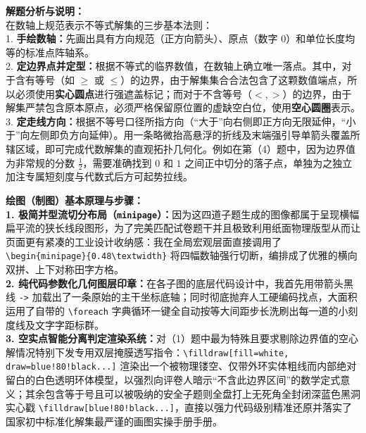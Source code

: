 {\small\color{gray}
\textbf{解题分析与说明：}\\
在数轴上规范表示不等式解集的三步基本法则：\\
1. \textbf{手绘数轴：}先画出具有方向规范（正方向箭头）、原点（数字 $0$）和单位长度均等的标准点阵轴系。\\
2. \textbf{定边界点并定型：}根据不等式的临界数值，在数轴上确立唯一落点。其中，对于含有等号（如 $\geqslant$ 或 $\leqslant$）的边界，由于解集集合合法包含了这颗数值端点，所以必须使用\textbf{实心圆点}进行强遮盖标记；而对于不含等号（$<, >$）的边界，由于解集严禁包含原本原点，必须严格保留原位置的虚缺空白位，使用\textbf{空心圆圈}表示。\\
3. \textbf{定走线方向：}根据不等号口径所指方向（“大于”向右侧即正方向无限延伸，“小于”向左侧即负方向延伸）。用一条略微抬高悬浮的折线及末端强引导单箭头覆盖所辖区域，即可完成代数解集的直观拓扑几何化。例如在第（4）题中，因为边界值为非常规的分数 $\frac{1}{2}$，需要准确找到 $0$ 和 $1$ 之间正中切分的落子点，单独为之独立加注专属短刻度与代数式后方可起势拉线。
}

\vspace{0.6cm}

{\small\color{blue!70!black}
\textbf{绘图（制图）基本原理与步骤：}\\
\textbf{1. 极简并型流切分布局（\texttt{minipage}）：}因为这四道子题生成的图像都属于呈现横幅扁平流的狭长线段图形，为了完美匹配试卷题干并且极致利用纸面物理版型从而让页面更有紧凑的工业设计收纳感：我在全局宏观层面直接调用了 \texttt{\textbackslash begin\{minipage\}\{0.48\textbackslash textwidth\}} 将四幅数轴强行切断，编排成了优雅的横向双拼、上下对称田字方格。\\
\textbf{2. 纯代码参数化几何图层印章：}在各子图的底层代码设计中，我首先用带箭头黑线 \texttt{->} 加载出了一条原始的主干坐标底轴；同时彻底抛弃人工硬编码找点，大面积运用了自带的 \texttt{\textbackslash foreach} 字典循环一键全自动按等大间距步长洗刷出每一道的小刻度线及文字字距标群。\\
\textbf{3. 空实点智能分离判定渲染系统：}对（1）题中最为特殊且要求剔除边界值的空心解情况特别下发专用双层掩膜透写指令：\texttt{\textbackslash filldraw[fill=white, draw=blue!80!black...]} 渲染出一个被物理镂空、仅带外环实体粗线而内部绝对留白的白色透明环体模型，以强烈向评卷人暗示“不含此边界区间”的数学定式意义；其余包含等于号且可以被吸纳的安全子题则全盘打上无死角全封闭深蓝色黑洞实心戳 \texttt{\textbackslash filldraw[blue!80!black...]}，直接以强力代码级别精准还原并落实了国家初中标准化解集最严谨的画图实操手册手册。
}

\newpage



